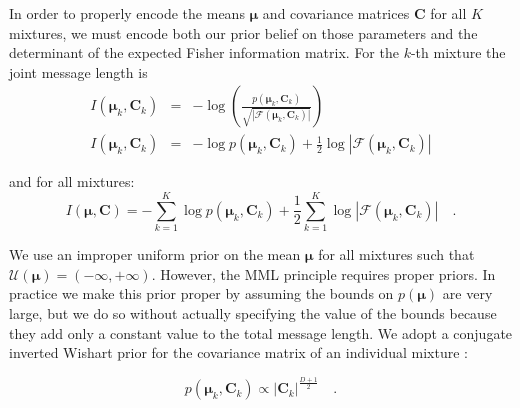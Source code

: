 \documentclass{elsarticle}
\newcommand{\vect}[1]{\boldsymbol{\mathbf{#1}}}
\def\cov{C}
\def\veccov{\vect{\cov}}
\def\vecmean{\vect{\mu}}
\newcommand{\fisher}[1]{\mathcal{F}\left(#1\right)}
\newcommand{\detfisher}[1]{\left|\fisher{#1}\right|}
\newcommand{\prior}[1]{p\left(#1\right)}
\begin{document}
In order to properly encode the means $\vecmean$ and covariance matrices
$\veccov$ for all $K$ mixtures, we must encode both our prior belief on 
those parameters and the determinant of the expected Fisher information 
matrix. For the $k$-th mixture the joint message length is
\begin{eqnarray}
  I(\vecmean_k,\veccov_k) &=& -\log{\left(\frac{\prior{{\vecmean_k,\veccov_k}}}{\sqrt{\detfisher{{\vecmean_k,\veccov_k}}}}\right)} \nonumber \\ 
  I(\vecmean_k,\veccov_k) &=& -\log{\prior{{\vecmean_k,\veccov_k}}} + \frac{1}{2}\log{\detfisher{{\vecmean_k,\veccov_k}}}
\end{eqnarray}

\noindent{}and for all mixtures:
\begin{equation}
  I(\vecmean,\veccov) = -\sum_{k=1}^{K}\log{\prior{{\vecmean_k,\veccov_k}}} + \frac{1}{2}\sum_{k=1}^{K}\log{\detfisher{{\vecmean_k,\veccov_k}}} \quad .
  \label{eq:I_component_params}
\end{equation}

We use an improper uniform prior on the mean $\vecmean$ for all mixtures such
that 
    $\mathcal{U}(\vecmean) = (-\infty, +\infty)$.
However,  the MML principle requires proper priors. In practice we make 
this prior proper by assuming the bounds on $\prior{\vecmean}$ are very large, but 
we do so without actually specifying the value of the bounds because they add 
only a constant value to the total message length.
We adopt a conjugate inverted Wishart prior for the covariance matrix of an
individual mixture \cite[Section 5.2.3 of][]{Schafer_1997}:

\begin{equation}
  \prior{{\vecmean_k, \veccov_k}} \propto |\veccov_k|^{\frac{D+1}{2}} \quad .
  \label{eq:covariance-prior}
\end{equation}
\end{document}
